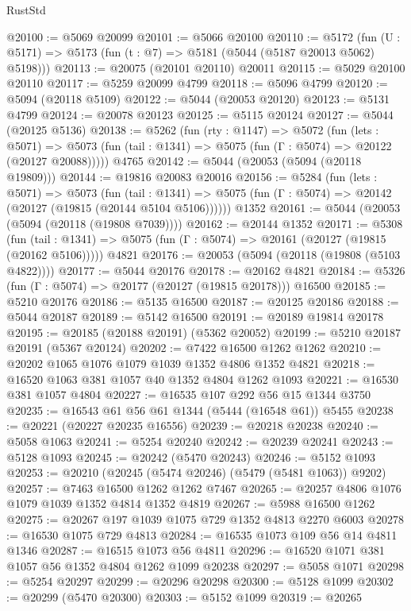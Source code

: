 \begin{lexlean}{RustStd}
\begin{coremodule}
@20100 := @5069 @20099
@20101 := @5066 @20100
@20110 := @5172
    (fun (U : @5171) => @5173 (fun (t : @7) => @5181 (@5044 (@5187 @20013 @5062) @5198)))
@20113 := @20075 (@20101 @20110) @20011
@20115 := @5029 @20100 @20110
@20117 := @5259 @20099 @4799
@20118 := @5096 @4799
@20120 := @5094 (@20118 @5109)
@20122 := @5044 (@20053 @20120)
@20123 := @5131 @4799
@20124 := @20078 @20123
@20125 := @5115 @20124
@20127 := @5044 (@20125 @5136)
@20138 := @5262
    (fun (rty : @1147) =>
    @5072
      (fun (lets : @5071) =>
      @5073 (fun (tail : @1341) => @5075 (fun (Γ : @5074) => @20122 (@20127 @20088)))))
    @4765
@20142 := @5044 (@20053 (@5094 (@20118 @19809)))
@20144 := @19816 @20083 @20016
@20156 := @5284
    (fun (lets : @5071) =>
    @5073
      (fun (tail : @1341) =>
      @5075 (fun (Γ : @5074) => @20142 (@20127 (@19815 (@20144 @5104 @5106))))))
    @1352
@20161 := @5044 (@20053 (@5094 (@20118 (@19808 @7039))))
@20162 := @20144 @1352
@20171 := @5308
    (fun (tail : @1341) => @5075 (fun (Γ : @5074) => @20161 (@20127 (@19815 (@20162 @5106)))))
    @4821
@20176 := @20053 (@5094 (@20118 (@19808 (@5103 @4822))))
@20177 := @5044 @20176
@20178 := @20162 @4821
@20184 := @5326 (fun (Γ : @5074) => @20177 (@20127 (@19815 @20178))) @16500
@20185 := @5210 @20176
@20186 := @5135 @16500
@20187 := @20125 @20186
@20188 := @5044 @20187
@20189 := @5142 @16500
@20191 := @20189 @19814 @20178
@20195 := @20185 (@20188 @20191) (@5362 @20052)
@20199 := @5210 @20187 @20191 (@5367 @20124)
@20202 := @7422 @16500 @1262 @1262
@20210 := @20202 @1065 @1076 @1079 @1039 @1352 @4806 @1352 @4821
@20218 := @16520 @1063 @381 @1057 @40 @1352 @4804 @1262 @1093
@20221 := @16530 @381 @1057 @4804
@20227 := @16535 @107 @292 @56 @15 @1344 @3750
@20235 := @16543 @61 @56 @61 @1344 (@5444 (@16548 @61)) @5455
@20238 := @20221 (@20227 @20235 @16556)
@20239 := @20218 @20238
@20240 := @5058 @1063
@20241 := @5254 @20240
@20242 := @20239 @20241
@20243 := @5128 @1093
@20245 := @20242 (@5470 @20243)
@20246 := @5152 @1093
@20253 := @20210 (@20245 (@5474 @20246) (@5479 (@5481 @1063)) @9202)
@20257 := @7463 @16500 @1262 @1262 @7467
@20265 := @20257 @4806 @1076 @1079 @1039 @1352 @4814 @1352 @4819
@20267 := @5988 @16500 @1262
@20275 := @20267 @197 @1039 @1075 @729 @1352 @4813 @2270 @6003
@20278 := @16530 @1075 @729 @4813
@20284 := @16535 @1073 @109 @56 @14 @4811 @1346
@20287 := @16515 @1073 @56 @4811
@20296 := @16520 @1071 @381 @1057 @56 @1352 @4804 @1262 @1099 @20238
@20297 := @5058 @1071
@20298 := @5254 @20297
@20299 := @20296 @20298
@20300 := @5128 @1099
@20302 := @20299 (@5470 @20300)
@20303 := @5152 @1099
@20319 := @20265

\end{coremodule}
\end{lexlean}
